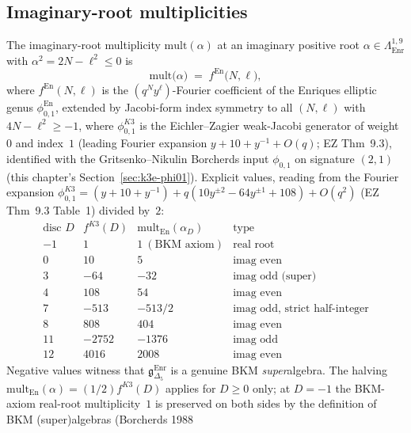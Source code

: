 \subsection{Imaginary-root multiplicities}
\label{subsec:bkm-enriques-imaginary}

\begin{theorem}
\label{thm:bkm-enriques-imaginary}
The imaginary-root multiplicity $\mathrm{mult}(\alpha)$ at an
imaginary positive root $\alpha\in\Lambda^{1,9}_{\mathrm{Enr}}$
with $\alpha^2 = 2N - \ell^2 \leq 0$ is
\[
 \mathrm{mult}\bigl(\alpha\bigr)
 \;=\;
 f^{\mathrm{En}}\bigl(N, \ell\bigr),
\]
where $f^{\mathrm{En}}(N,\ell)$ is the $(q^N y^\ell)$-Fourier
coefficient of the Enriques elliptic genus
$\phi^{\mathrm{En}}_{0,1}$, extended by
Jacobi-form index symmetry to all $(N,\ell)$ with
$4N - \ell^2 \geq -1$, where $\phi_{0,1}^{K3}$ is the
Eichler--Zagier weak-Jacobi generator of weight~$0$ and index~$1$
(leading Fourier expansion $y + 10 + y^{-1} + O(q)$; EZ Thm~9.3),
identified with the Gritsenko--Nikulin Borcherds input
$\phi_{0,1}$ on signature $(2,1)$ (this chapter's
Section~\ref{sec:k3e-phi01}). Explicit values, reading from the
Fourier expansion $\phi_{0,1}^{K3} = (y+10+y^{-1}) + q(10y^{\pm 2}
- 64 y^{\pm 1} + 108) + O(q^2)$ (EZ Thm~9.3 Table~1) divided by~$2$:
\[
 \begin{array}{l|l|l|l}
 \text{disc } D & f^{K3}(D) & \mathrm{mult}_{\mathrm{En}}(\alpha_D)
 & \text{type} \\ \hline
 -1 & 1 & 1\ (\text{BKM axiom}) & \text{real root} \\
 0 & 10 & 5 & \text{imag even} \\
 3 & -64 & -32 & \text{imag odd (super)} \\
 4 & 108 & 54 & \text{imag even} \\
 7 & -513 & -513/2 & \text{imag odd, strict half-integer} \\
 8 & 808 & 404 & \text{imag even} \\
 11 & -2752 & -1376 & \text{imag odd} \\
 12 & 4016 & 2008 & \text{imag even}
 \end{array}
\]
Negative values witness that
$\mathfrak{g}_{\Delta_5}^{\mathrm{Enr}}$ is a genuine BKM
\emph{super}algebra. The halving
$\mathrm{mult}_{\mathrm{En}}(\alpha) = (1/2) f^{K3}(D)$
applies for $D \geq 0$ only; at $D = -1$ the BKM-axiom
real-root multiplicity~$1$ is preserved on both sides by the
definition of BKM (super)algebras (Borcherds 1988

\end{theorem}
